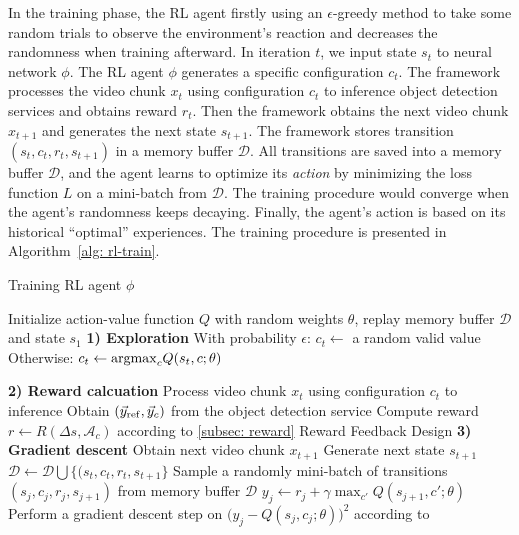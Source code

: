 In the training phase, the RL agent firstly using an $\epsilon$-greedy method to take some random trials to observe the environment's reaction and decreases the randomness when training afterward. In iteration $t$, we input state $s_t $ to neural network $ \phi $. The RL agent $\phi$ generates a specific configuration $c_t$. The framework processes the video chunk $x_t$ using configuration $c_t$ to inference object detection services and obtains reward $r_t$. Then the framework obtains the next video chunk $x_{t+1}$ and generates the next state $ s_{t+1} $. The framework stores transition $(s_t, c_t, r_t, s_{t+1})$ in a memory buffer $\mathcal{D}$. All transitions are saved into a memory buffer $ \mathcal{D} $, and the agent learns to optimize its \emph{action} by minimizing the loss function $ L $ on a mini-batch from $ \mathcal{D} $. The training procedure would converge when the agent's randomness keeps decaying. Finally, the agent's action is based on its historical ``optimal'' experiences. The training procedure is presented in Algorithm~\ref{alg: rl-train}.

\begin{algorithm}[!t]
		\caption{Training RL agent $ \phi $} %
		\label{alg: rl-train}
		\begin{algorithmic}[1]	
			\STATE Initialize action-value function $ Q $ with random weights $ \theta $, replay memory buffer $ \mathcal{D} $ and state $ s_1 $				
			\STATE \textbf{1) Exploration}
			\STATE With probability $\epsilon$:
			\STATE \hspace{1em} $c_t \leftarrow$ a random valid value 
			\STATE Otherwise:
			\STATE \hspace{1em} $ c_t \leftarrow {\rm argmax}_cQ(s_t, c; \theta) $ 

			\STATE \textbf{2) Reward calcuation} 
			\STATE Process video chunk $ x_t $ using configuration $ c_t $ to inference
			\STATE Obtain $ (\vec{y}_{\rm ref}, \vec{y}_c) $ from the object detection service
			\STATE Compute reward $ r \leftarrow R(\Delta s, \mathcal{A}_c) $ according to \ref{subsec: reward} Reward Feedback Design 
			\STATE \textbf{3) Gradient descent}
			\STATE Obtain next video chunk $ x_{t+1} $
			\STATE Generate next state $ s_{t+1} $
			\STATE $ \mathcal{D} \leftarrow \mathcal{D} \bigcup \{(s_t, c_t, r_t, s_{t+1} \} $
			\STATE Sample a randomly mini-batch of transitions $ (s_j, c_j, r_j, s_{j+1}) $ from memory buffer $ \mathcal{D} $
			\STATE $ y_j \leftarrow r_j + \gamma \max_{c'}Q(s_{j+1}, c'; \theta) $
			\STATE Perform a gradient descent step on $ \big(y_j - Q(s_j, c_j; \theta)\big)^2 $ according to~\cite{DQN}
			\ENDFOR
		\end{algorithmic}
\end{algorithm}

